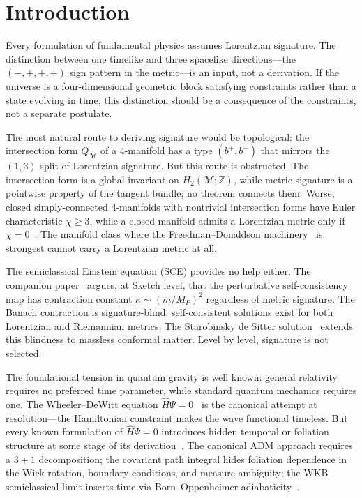 \documentclass[12pt,a4paper]{article}
\theoremstyle{definition}
\theoremstyle{remark}
\begin{document}
\section{Introduction}
\label{sec:intro}

Every formulation of fundamental physics assumes Lorentzian signature.
The distinction between one timelike and three spacelike directions---the
$(-,+,+,+)$ sign pattern in the metric---is an input, not a derivation.
If the universe is a four-dimensional geometric block satisfying
constraints rather than a state evolving in time, this distinction should
be a consequence of the constraints, not a separate postulate.

The most natural route to deriving signature would be topological: the
intersection form $Q_\mathcal{M}$ of a 4-manifold has a type $(b^+, b^-)$
that mirrors the $(1,3)$ split of Lorentzian signature. But this route is
obstructed. The intersection form is a global invariant on
$H_2(\mathcal{M};\mathbb{Z})$, while metric signature is a pointwise
property of the tangent bundle; no theorem connects them. Worse, closed
simply-connected 4-manifolds with nontrivial intersection forms have
Euler characteristic $\chi \geq 3$, while a closed manifold admits a
Lorentzian metric only if $\chi = 0$~\cite{markus}. The manifold class
where the Freedman--Donaldson machinery~\cite{freedman,donaldson} is
strongest cannot carry a Lorentzian metric at all.

The semiclassical Einstein equation (SCE) provides no help either. The
companion paper~\cite{fixed_point} argues, at Sketch level, that the perturbative
self-consistency map has contraction constant $\kappa \sim (m/M_P)^2$
regardless of metric signature. The Banach contraction is
signature-blind: self-consistent solutions exist for both Lorentzian and
Riemannian metrics. The Starobinsky de Sitter solution~\cite{starobinsky}
extends this blindness to massless conformal matter. Level by level,
signature is not selected.

The foundational tension in quantum gravity is well known: general
relativity requires no preferred time parameter, while standard quantum
mechanics requires one. The Wheeler--DeWitt equation
$\hat{H}\Psi = 0$~\cite{dewitt,wheeler} is the canonical attempt at
resolution---the Hamiltonian constraint makes the wave functional
timeless. But every known formulation of $\hat{H}\Psi = 0$ introduces
hidden temporal or foliation structure at some stage of its
derivation~\cite{kuchar}. The canonical ADM approach requires a $3+1$
decomposition; the covariant path integral hides foliation dependence in
the Wick rotation, boundary conditions, and measure ambiguity; the WKB
semiclassical limit inserts time via Born--Oppenheimer
adiabaticity~\cite{halliwell,banks}.
\end{document}
